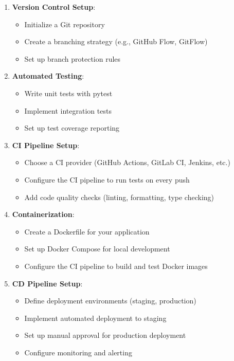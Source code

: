 \begin{enumerate}
    \item \textbf{Version Control Setup}:
    \begin{itemize}
        \item Initialize a Git repository
        \item Create a branching strategy (e.g., GitHub Flow, GitFlow)
        \item Set up branch protection rules
    \end{itemize}
    
    \item \textbf{Automated Testing}:
    \begin{itemize}
        \item Write unit tests with pytest
        \item Implement integration tests
        \item Set up test coverage reporting
    \end{itemize}
    
    \item \textbf{CI Pipeline Setup}:
    \begin{itemize}
        \item Choose a CI provider (GitHub Actions, GitLab CI, Jenkins, etc.)
        \item Configure the CI pipeline to run tests on every push
        \item Add code quality checks (linting, formatting, type checking)
    \end{itemize}
    
    \item \textbf{Containerization}:
    \begin{itemize}
        \item Create a Dockerfile for your application
        \item Set up Docker Compose for local development
        \item Configure the CI pipeline to build and test Docker images
    \end{itemize}
    
    \item \textbf{CD Pipeline Setup}:
    \begin{itemize}
        \item Define deployment environments (staging, production)
        \item Implement automated deployment to staging
        \item Set up manual approval for production deployment
        \item Configure monitoring and alerting
    \end{itemize}
\end{enumerate}

